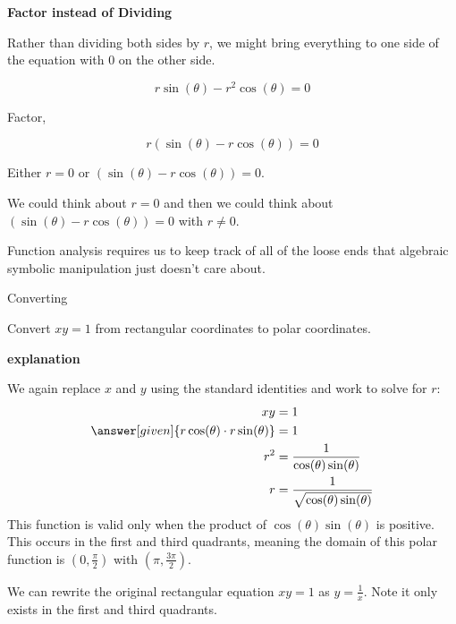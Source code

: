 \documentclass{ximera}
\begin{document}
\begin{idea}  \textbf{\textcolor{blue!55!black}{Factor instead of Dividing}} 



Rather than dividing both sides by $r$, we might bring everything to one side of the equation with $0$ on the other side.



\[ r \sin(\theta) - r^2 \cos(\theta) = 0   \]


Factor, 

\[ r (\sin(\theta) - r \cos(\theta)) = 0   \]



Either $r = 0$ or $(\sin(\theta) - r \cos(\theta)) = 0$.

We could think about $r=0$ and then we could think about $(\sin(\theta) - r \cos(\theta)) = 0$ with $r \ne 0$.


Function analysis requires us to keep track of all of the loose ends that algebraic symbolic manipulation just doesn't care about.



\end{idea}












\begin{example} Converting

  Convert $xy = 1$ from rectangular coordinates to polar coordinates.

\textbf{\textcolor{red!75!green}{explanation}} 

    We again replace $x$ and $y$ using the standard identities and
    work to solve for $r$:
    \begin{align*}
	xy &= 1 \\
	\answer[given]{r\cos(\theta)\cdot r\sin(\theta)} & = 1\\
	r^2 & = \frac{1}{\cos(\theta)\sin(\theta)}\\
	r & = \frac{1}{\sqrt{\cos(\theta)\sin(\theta)}}\\
    \end{align*}
    This function is valid only when the product of
    $\cos(\theta) \sin(\theta)$ is positive. This occurs in the first and
    third quadrants, meaning the domain of this polar function is
    $(0,\tfrac{\pi}{2})$ with $(\pi,\tfrac{3\pi}{2})$.
      
    We can rewrite the original rectangular equation $xy=1$ as
    $y=\frac{1}{x}$. Note it only exists in the first and third quadrants.

\end{example}
\end{document}
